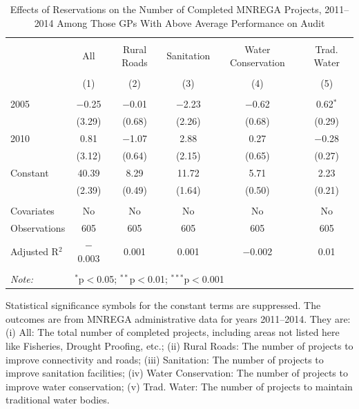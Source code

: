 \begin{table}[!htbp]
\centering
\begin{threeparttable}

  \caption{Effects of Reservations on the Number of Completed MNREGA Projects, 2011--2014 Among Those GPs With Above Average Performance on Audit} 
  \label{main_mnrega_audit} 
\scriptsize 
\begin{tabular}{@{\extracolsep{0pt}}lccccc} 
\\[-1.8ex]\hline 
\hline \\[-1.8ex] 
 & All & Rural Roads & Sanitation & Water Conservation & Trad. Water \\ 
\\[-1.8ex] & (1) & (2) & (3) & (4) & (5)\\ 
\hline \\[-1.8ex] 
 2005 & $-$0.25 & $-$0.01 & $-$2.23 & $-$0.62 & 0.62$^{*}$ \\ 
  & (3.29) & (0.68) & (2.26) & (0.68) & (0.29) \\ 
  2010 & 0.81 & $-$1.07 & 2.88 & 0.27 & $-$0.28 \\ 
  & (3.12) & (0.64) & (2.15) & (0.65) & (0.27) \\ 
  Constant & 40.39 & 8.29 & 11.72 & 5.71 & 2.23 \\ 
  & (2.39) & (0.49) & (1.64) & (0.50) & (0.21) \\ 
 \hline \\[-1.8ex] 
Covariates & No & No & No & No & No \\ 
Observations & 605 & 605 & 605 & 605 & 605 \\ 
Adjusted R$^{2}$ & $-$0.003 & 0.001 & 0.001 & $-$0.002 & 0.01 \\ 
\hline 
\hline \\[-1.8ex] 
\textit{Note:}  & \multicolumn{5}{l}{$^{*}$p$<$0.05; $^{**}$p$<$0.01; $^{***}$p$<$0.001} \\ 
\end{tabular} 
\begin{tablenotes}[flushleft]
\scriptsize
\item[] Statistical significance symbols for the constant terms are suppressed. The outcomes are from MNREGA administrative data for years 2011--2014. They are: 
(i) All: The total number of completed projects, including areas not listed here like Fisheries, Drought Proofing, etc.;
(ii) Rural Roads: The number of projects to improve connectivity and roads;
(iii) Sanitation: The number of projects to improve sanitation facilities;
(iv) Water Conservation: The number of projects to improve water conservation;
(v) Trad. Water: The number of projects to maintain traditional water bodies.
\end{tablenotes}
\end{threeparttable}
\end{table}
